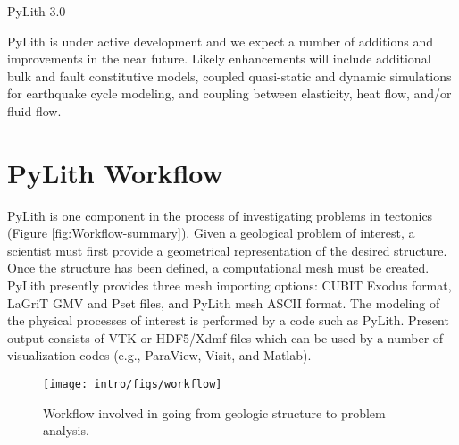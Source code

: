 PyLith 3.0 

PyLith is under active development and we expect a number of additions
and improvements in the near future. Likely enhancements will include
additional bulk and fault constitutive models, coupled quasi-static
and dynamic simulations for earthquake cycle modeling, and coupling
between elasticity, heat flow, and/or fluid flow.


\section{PyLith Workflow}

PyLith is one component in the process of investigating problems in
tectonics (Figure \vref{fig:Workflow-summary}). Given a geological
problem of interest, a scientist must first provide a geometrical
representation of the desired structure. Once the structure has been
defined, a computational mesh must be created. PyLith presently
provides three mesh importing options: CUBIT Exodus format, LaGriT GMV
and Pset files, and PyLith mesh ASCII format. The modeling of the
physical processes of interest is performed by a code such as
PyLith. Present output consists of VTK or HDF5/Xdmf files which can be
used by a number of visualization codes (e.g., ParaView, Visit, and
Matlab).

\begin{figure}[htbp]
  \texttt{[image: intro/figs/workflow]}
  \caption{Workflow involved in going from geologic structure to
    problem analysis.}
  \label{fig:Workflow-summary}
\end{figure}

